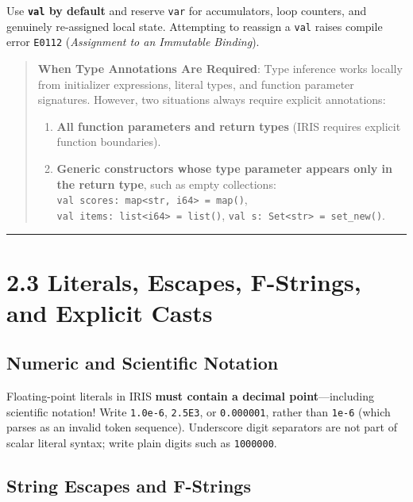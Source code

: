 \documentclass[
  english,
  oneside]{book}
\providecommand{\tightlist}{%
  \setlength{\itemsep}{0pt}\setlength{\parskip}{0pt}}
\begin{document}
Use \textbf{\texttt{val} by default} and reserve \texttt{var} for
accumulators, loop counters, and genuinely re-assigned local state.
Attempting to reassign a \texttt{val} raises compile error
\texttt{E0112} (\emph{Assignment to an Immutable Binding}).

\begin{quote}
\textbf{When Type Annotations Are Required}: Type inference works
locally from initializer expressions, literal types, and function
parameter signatures. However, two situations always require explicit
annotations:

\begin{enumerate}
\def\labelenumi{\arabic{enumi}.}
\tightlist
\item
  \textbf{All function parameters and return types} (IRIS requires
  explicit function boundaries).
\item
  \textbf{Generic constructors whose type parameter appears only in the
  return type}, such as empty collections:
  \texttt{val\ scores:\ map\textless{}str,\ i64\textgreater{}\ =\ map()},
  \texttt{val\ items:\ list\textless{}i64\textgreater{}\ =\ list()},
  \texttt{val\ s:\ Set\textless{}str\textgreater{}\ =\ set\_new()}.
\end{enumerate}
\end{quote}

\begin{center}\rule{0.5\linewidth}{0.5pt}\end{center}

\section{2.3 Literals, Escapes, F-Strings, and Explicit
Casts}\label{literals-escapes-f-strings-and-explicit-casts}

\subsection{Numeric and Scientific
Notation}\label{numeric-and-scientific-notation}

Floating-point literals in IRIS \textbf{must contain a decimal
point}---including scientific notation! Write \texttt{1.0e-6},
\texttt{2.5E3}, or \texttt{0.000001}, rather than \texttt{1e-6} (which
parses as an invalid token sequence). Underscore digit separators are
not part of scalar literal syntax; write plain digits such as
\texttt{1000000}.

\subsection{String Escapes and
F-Strings}\label{string-escapes-and-f-strings}
\end{document}
